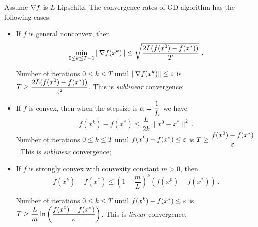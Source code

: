 \begin{theorem}\label{Thm:ConvergenceOfGDViaTaylorAnalysis}
Assume $\nabla f$ is $L$-Lipschitz. The convergence rates of GD algorithm has the following cases:
\begin{itemize}
\item[\emph{(a)}] If $f$ is general nonconvex, then $$\min\li_{0\leq k\leq T-1}\|\grad f(x^k)\|\leq \sqrt{\dfrac{2L(f(x^0)-f(x^*))}{T}} \ .$$

Number of iterations $0\leq k\leq T$ until
$\|\nabla f(x^k)\|\leq \varepsilon$ is $T\geq \dfrac{2L(f(x^0)-f(x^*))}{\varepsilon^2}$. This is \emph{sublinear} convergence;

\item[(b)] If $f$ is convex, then when the stepsize is $\alpha=\dfrac{1}{L}$ we have $$f(x^k)-f(x^*)\leq \dfrac{L}{2k}\|x^0-x^*\|^2 \ .$$
Number of iterations $0\leq k\leq T$ until
$f(x^k)-f(x^*)\leq \varepsilon$ is $T\geq \dfrac{f(x^0)-f(x^*)}{\varepsilon}$. This is \emph{sublinear} convergence;

\item[\emph{(c)}] If $f$ is strongly convex with convexity constant $m>0$, then 
$$f(x^k)-f(x^*)\leq \left(1-\dfrac{m}{L}\right)^k(f(x^0)-f(x^*)) \ .$$

Number of iterations $0\leq k\leq T$ until
$f(x^k)-f(x^*)\leq \varepsilon$ is $T\geq \dfrac{L}{m}\ln\left(\dfrac{f(x^0)-f(x^*)}{\varepsilon}\right)$. This is \emph{linear} convergence.

\end{itemize}
\end{theorem}

